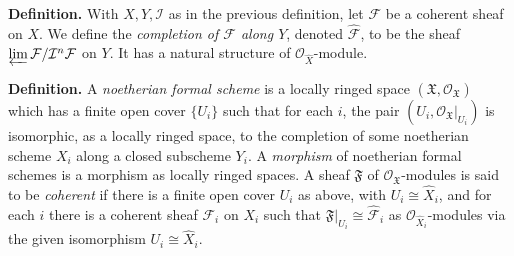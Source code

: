 {\medskip
\noindent\textbf{Definition.} With $X,Y,\mathcal I$ as in the previous definition, let $\mathcal F$ be a coherent sheaf on $X$. We define the \emph{completion of $\mathcal F$ along $Y$}, denoted $\widehat{\mathcal F}$, to be the sheaf $\varprojlim\mathcal F/\mathcal I^n\mathcal F$ on $Y$. It has a natural structure of $\mathcal O_{\widehat X}$-module.

\medskip
\noindent\textbf{Definition.} A \emph{noetherian formal scheme} is a locally ringed space $(\mathfrak X,\mathcal O_{\mathfrak X})$ which has a finite open cover $\{U_i\}$ such that for each $i$, the pair $(U_i,\mathcal O_{\mathfrak X}|_{U_i})$ is isomorphic, as a locally ringed space, to the completion of some noetherian scheme $X_i$ along a closed subscheme $Y_i$. A \emph{morphism} of noetherian formal schemes is a morphism as locally ringed spaces. A sheaf $\mathfrak F$ of $\mathcal O_{\mathfrak X}$-modules is said to be \emph{coherent} if there is a finite open cover $U_i$ as above, with $U_i\cong\widehat X_i$, and for each $i$ there is a coherent sheaf $\mathcal F_i$ on $X_i$ such that $\mathfrak F|_{U_i}\cong\widehat{\mathcal F}_i$ as $\mathcal O_{\widehat X_i}$-modules via the given isomorphism $U_i\cong\widehat X_i$.}

